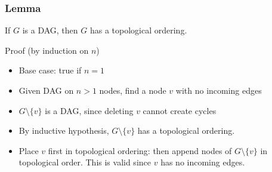 \documentclass[11pt]{article}
\begin{document}
\subsubsection{Lemma}
\label{sec:org9c52287}
If \(G\) is a DAG, then \(G\) has a topological ordering.

Proof (by induction on \(n\))
\begin{itemize}
\item Base case: true if \(n=1\)
\item Given DAG on \(n>1\) nodes, find a node \(v\) with no incoming edges
\item \(G \setminus \{v\}\) is a DAG, since deleting \(v\) cannot create cycles
\item By inductive hypothesis, \(G\setminus\{v\}\) has a topological ordering.
\item Place \(v\) first in topological ordering: then append nodes of \(G\setminus \{v\}\) in topological order. This is valid since \(v\) has no incoming edges.
\end{itemize}
\end{document}
